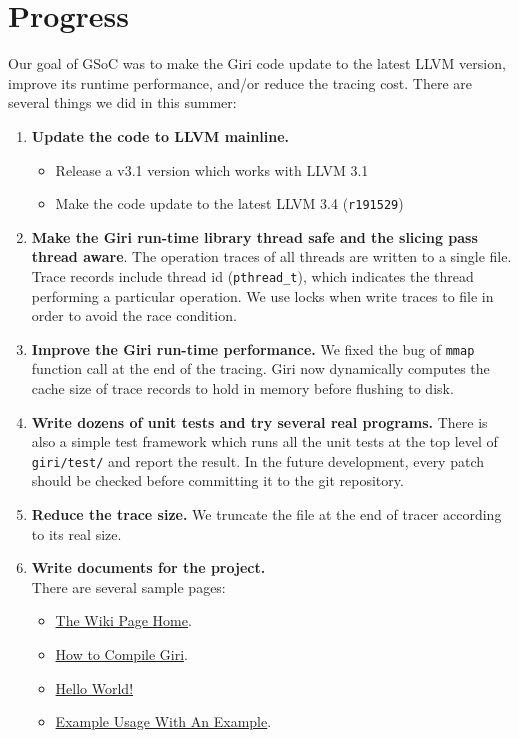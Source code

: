 \documentclass[DIV=calc, paper=a4, fontsize=11pt, twocolumn]{scrartcl}
\begin{document}
\section{Progress}
\label{sec:progress}
Our goal of GSoC was to make the Giri code update to the latest LLVM version, improve its runtime performance, and/or reduce the tracing cost.
There are several things we did in this summer:
\begin{enumerate}
	\item \textbf{Update the code to LLVM mainline.}
		\begin{itemize}
			\item Release a v3.1 version which works with LLVM 3.1
			\item Make the code update to the latest LLVM 3.4 (\texttt{r191529})
		\end{itemize}
	\item \textbf{Make the Giri run-time library thread safe and the slicing pass thread aware}.
		The operation traces of all threads are written to a single file.
		Trace records include thread id (\texttt{pthread\_t}), which indicates the thread performing a particular operation.
		We use locks when write traces to file in order to avoid the race condition.
	\item \textbf{Improve the Giri run-time performance.}
		We fixed the bug of \texttt{mmap} function call at the end of the tracing.
		Giri now dynamically computes the cache size of trace records to hold in memory before flushing to disk.
	\item \textbf{Write dozens of unit tests and try several real programs.}
		There is also a simple test framework which runs all the unit tests at the top level of \texttt{giri/test/} and report the result.
		In the future development, every patch should be checked before committing it to the git repository.
	\item \textbf{Reduce the trace size.}
		We truncate the file at the end of tracer according to its real size.
	\item \textbf{Write documents for the project.}\\
		There are several sample pages:
		\begin{itemize}
			\item \href{https://github.com/liuml07/giri/wiki}{The Wiki Page Home}.
			\item \href{https://github.com/liuml07/giri/wiki/How-to-Compile-Giri}{How to Compile Giri}.
			\item \href{https://github.com/liuml07/giri/wiki/Hello-World}{Hello World!}
			\item \href{https://github.com/liuml07/giri/wiki/Example-Usage}{Example Usage With An Example}.
		\end{itemize}
\end{enumerate}
\end{document}
